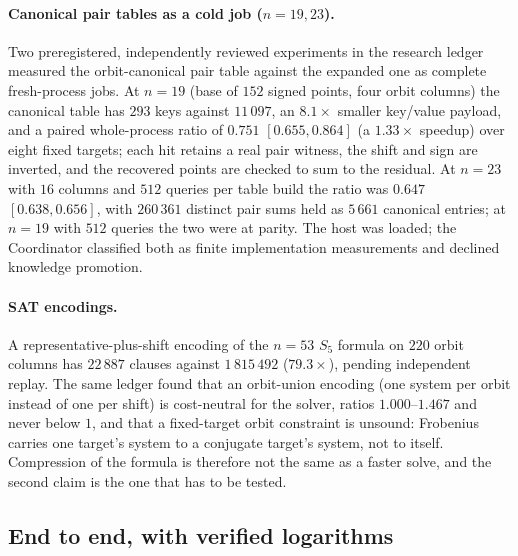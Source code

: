 \paragraph{Canonical pair tables as a cold job ($n=19,23$).}
Two preregistered, independently reviewed experiments in the research
ledger measured the orbit-canonical pair table against the expanded one
as complete fresh-process jobs.
At $n=19$ (base of $152$ signed points, four orbit columns) the
canonical table has $293$ keys against $11\,097$, an $8.1\times$ smaller
key/value payload, and a paired whole-process ratio of $0.751$
$[0.655,0.864]$ (a $1.33\times$ speedup) over eight fixed targets; each
hit retains a real pair witness, the shift and sign are inverted, and
the recovered points are checked to sum to the residual. At $n=23$
with $16$ columns and $512$ queries per table build the ratio was
$0.647$ $[0.638,0.656]$, with $260\,361$ distinct pair sums held as
$5\,661$ canonical entries; at $n=19$ with $512$ queries the two were at
parity. The host was loaded; the Coordinator classified both as finite
implementation measurements and declined knowledge promotion.

\paragraph{SAT encodings.}
A representative-plus-shift encoding of the $n=53$ $S_5$ formula on
$220$ orbit columns has $22\,887$ clauses against $1\,815\,492$
($79.3\times$), pending independent
replay. The same ledger found that an orbit-union encoding (one system per
orbit instead of one per shift) is cost-neutral for the solver,
ratios $1.000$--$1.467$ and never below $1$, and that a fixed-target
orbit constraint is unsound: Frobenius carries one target's system
to a conjugate target's system, not to
itself. Compression of the formula is therefore not the same as a faster
solve, and the second claim is the one that has to be tested.

\subsection{End to end, with verified logarithms}
\label{sec:bench-e2e}

